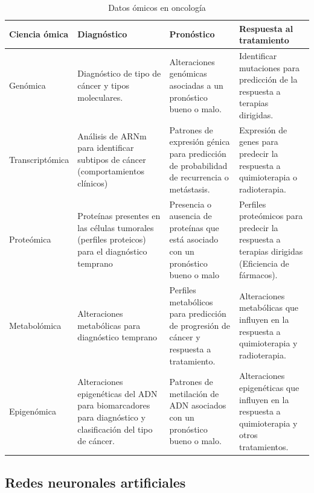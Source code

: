 \begin{table}[!h]
    \scriptsize
    \centering
    \caption{Datos ómicos en oncología}
    
    \begin{tabular}{
    >{\centering\arraybackslash}m{2cm}
    >{\centering\arraybackslash}m{4cm}
    >{\centering\arraybackslash}m{4cm} 
    >{\centering\arraybackslash}m{4cm}}
\hline 
        \textbf{Ciencia ómica} & 
        \textbf{Diagnóstico} & 
        \textbf{Pronóstico} & 
        \textbf{Respuesta al tratamiento}

\\      
    \hline \hline 

    Genómica &
    Diagnóstico de tipo de cáncer y tipos moleculares. &
    Alteraciones genómicas asociadas a un pronóstico bueno o malo. &
    Identificar mutaciones para predicción de la respuesta a terapias dirigidas.
\\
    \hline
    Transcriptómica &
    Análisis de ARNm para identificar subtipos de cáncer (comportamientos clínicos) &
    Patrones de expresión génica para predicción de probabilidad de recurrencia o metástasis. &
    Expresión de genes para predecir la respuesta a quimioterapia o radioterapia.
\\
    \hline
    Proteómica &
    Proteínas presentes en las células tumorales (perfiles proteicos) para el diagnóstico temprano &
    Presencia o ausencia de proteínas que está asociado con un pronóstico bueno o malo &
    Perfiles proteómicos para predecir la respuesta a terapias dirigidas (Eficiencia de fármacos).
\\
    \hline
    Metabolómica &
    Alteraciones metabólicas para diagnóstico temprano &
    Perfiles metabólicos para predicción de progresión de cáncer y respuesta a tratamiento. &
    Alteraciones metabólicas que influyen en la respuesta a quimioterapia y radioterapia.
\\
     \hline
     Epigenómica &
     Alteraciones epigenéticas del ADN para biomarcadores para diagnóstico y clasificación del tipo de cáncer. &
     Patrones de metilación de ADN asociados con un pronóstico bueno o malo. &
     Alteraciones epigenéticas  que influyen en la respuesta a quimioterapia y otros tratamientos.
\\
    \hline
    \end{tabular}
    \label{tab:Omic_onco}
\end{table}

\subsection{Redes neuronales artificiales}

